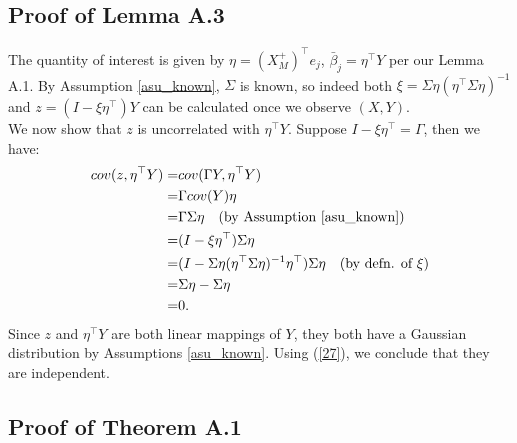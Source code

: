 \documentclass[11pt]{article}
\newcommand{\q}{\text{\quad}}
\newcommand{\NL}{\\[.4cm]}
\begin{document}
	
	\subsection{Proof of Lemma A.3}
	
	The quantity of interest is given by $\eta=(X_M^+)^\top e_j$, $\bar{\beta}_{j}=\eta^\top Y$ per our Lemma A.1. By Assumption \ref{asu_known}, $\Sigma$ is known, so indeed both $
	\xi=\Sigma\eta(\eta^\top \Sigma\eta)^{-1}$ and $z=(I-\xi\eta^\top )Y$ can be calculated once we observe $(X,Y)$.\NL
	We now show that $z$ is uncorrelated with $\eta^\top Y$. Suppose $I-\xi\eta^\top =\Gamma$, then we have:
	\begin{equation}\label{27}
		\begin{split}
			cov(z,\eta^\top Y)
			=&cov(\Gamma Y,\eta^\top Y)\\
			=&\Gamma cov(Y)\eta\\
			=&\Gamma\Sigma\eta\q\text{(by Assumption \ref{asu_known})}\\
			=&(I-\xi\eta^\top)\Sigma\eta\\
			=&(I-
			\Sigma\eta(\eta^\top \Sigma\eta)^{-1}\eta^\top)\Sigma\eta\q\text{(by defn. of $\xi$)}\\
			=&\Sigma\eta-\Sigma\eta\\
			=&0.
		\end{split}
	\end{equation}
	Since $z$ and $\eta^\top Y$ are both linear mappings of $Y$, they both have a Gaussian distribution by Assumptions \ref{asu_known}. Using (\ref{27}), we conclude that they are independent.
	
	
	\subsection{Proof of Theorem A.1}
	
\end{document}
